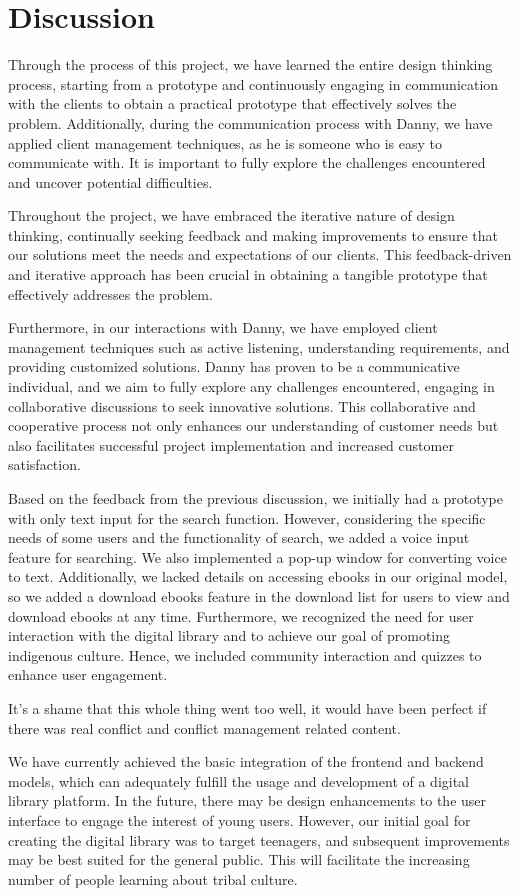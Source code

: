 \chapter{Discussion}

Through the process of this project, we have learned the entire design thinking process, starting from a prototype and continuously engaging in communication with the clients to obtain a practical prototype that effectively solves the problem. Additionally, during the communication process with Danny, we have applied client management techniques, as he is someone who is easy to communicate with. It is important to fully explore the challenges encountered and uncover potential difficulties.

Throughout the project, we have embraced the iterative nature of design thinking, continually seeking feedback and making improvements to ensure that our solutions meet the needs and expectations of our clients. This feedback-driven and iterative approach has been crucial in obtaining a tangible prototype that effectively addresses the problem.

Furthermore, in our interactions with Danny, we have employed client management techniques such as active listening, understanding requirements, and providing customized solutions. Danny has proven to be a communicative individual, and we aim to fully explore any challenges encountered, engaging in collaborative discussions to seek innovative solutions. This collaborative and cooperative process not only enhances our understanding of customer needs but also facilitates successful project implementation and increased customer satisfaction.

Based on the feedback from the previous discussion, we initially had a prototype with only text input for the search function. However, considering the specific needs of some users and the functionality of search, we added a voice input feature for searching. We also implemented a pop-up window for converting voice to text. Additionally, we lacked details on accessing ebooks in our original model, so we added a download ebooks feature in the download list for users to view and download ebooks at any time. Furthermore, we recognized the need for user interaction with the digital library and to achieve our goal of promoting indigenous culture. Hence, we included community interaction and quizzes to enhance user engagement.

It's a shame that this whole thing went too well, it would have been perfect if there was real conflict and conflict management related content.

We have currently achieved the basic integration of the frontend and backend models, which can adequately fulfill the usage and development of a digital library platform. In the future, there may be design enhancements to the user interface to engage the interest of young users. However, our initial goal for creating the digital library was to target teenagers, and subsequent improvements may be best suited for the general public. This will facilitate the increasing number of people learning about tribal culture.
